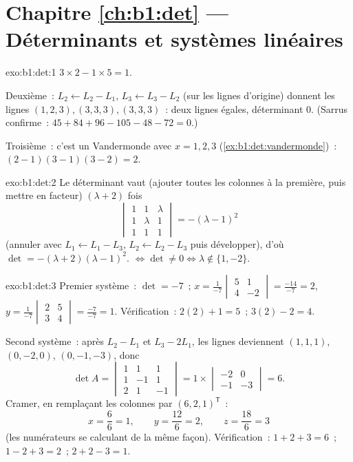 \section*{Chapitre \ref{ch:b1:det} --- Déterminants et systèmes linéaires}

\begin{solution}{exo:b1:det:1}
$3 \times 2 - 1 \times 5 = 1$.

Deuxième~: $L_2 \leftarrow L_2 - L_1$, $L_3 \leftarrow L_3 - L_2$ (sur
les lignes d'origine) donnent les lignes $(1,2,3), (3,3,3), (3,3,3)$~:
deux lignes égales, déterminant $0$. (Sarrus confirme~: $45 + 84 + 96 -
105 - 48 - 72 = 0$.)

Troisième~: c'est un Vandermonde avec $x = 1, 2, 3$
(\cref{ex:b1:det:vandermonde})~: $(2-1)(3-1)(3-2) = 2$.
\end{solution}

\begin{solution}{exo:b1:det:2}
Le déterminant vaut (ajouter toutes les colonnes à la première, puis
mettre en facteur) $(\lambda + 2)$ fois
\[
\begin{vmatrix}
1 & 1 & \lambda\\ 1 & \lambda & 1\\ 1 & 1 & 1
\end{vmatrix}
= -(\lambda - 1)^2
\]
(annuler avec $L_1 \leftarrow L_1 - L_3$, $L_2 \leftarrow L_2 - L_3$
puis développer), d'où $\det = -(\lambda+2)(\lambda-1)^2$. 
$\iff \det \neq 0 \iff \lambda \notin \{1, -2\}$.
\end{solution}

\begin{solution}{exo:b1:det:3}
Premier système~: $\det = -7$~;
$x = \frac{1}{-7}\begin{vmatrix} 5 & 1\\ 4 & -2\end{vmatrix}
= \frac{-14}{-7} = 2$,
$y = \frac{1}{-7}\begin{vmatrix} 2 & 5\\ 3 & 4\end{vmatrix}
= \frac{-7}{-7} = 1$. Vérification~: $2(2) + 1 = 5$~; $3(2) - 2 = 4$.

Second système~: après $L_2 - L_1$ et $L_3 - 2L_1$, les lignes
deviennent $(1,1,1)$, $(0,-2,0)$, $(0,-1,-3)$, donc
\[
\det A = \begin{vmatrix} 1&1&1\\ 1&-1&1\\ 2&1&-1\end{vmatrix}
= 1 \times \begin{vmatrix} -2 & 0\\ -1 & -3\end{vmatrix} = 6 .
\]
Cramer, en remplaçant les colonnes par $(6,2,1)^{\mathsf T}$~:
\[
x = \frac{6}{6} = 1, \qquad
y = \frac{12}{6} = 2, \qquad
z = \frac{18}{6} = 3
\]
(les numérateurs se calculant de la même façon). Vérification~:
$1 + 2 + 3 = 6$~; $1 - 2 + 3 = 2$~; $2 + 2 - 3 = 1$.
\end{solution}

